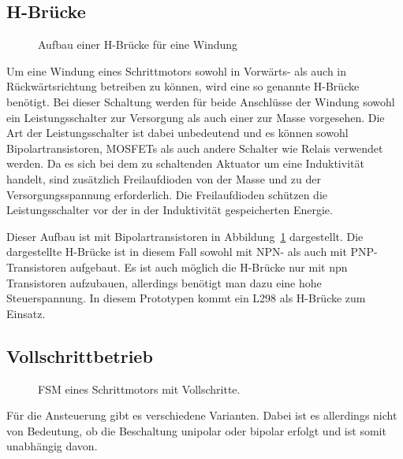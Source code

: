 \subsection{H-Brücke}

\begin{figure} \centering
	\begin{minipage}[t]{\linewidth} \centering
		
	\end{minipage}
	\caption{Aufbau einer H-Brücke für eine Windung}
	\label{img:hBruecke}
\end{figure}

Um eine Windung eines Schrittmotors sowohl in Vorwärts- als auch in Rückwärtsrichtung betreiben zu können, wird eine so genannte H-Brücke benötigt.
Bei dieser Schaltung werden für beide Anschlüsse der Windung sowohl ein Leistungsschalter zur Versorgung als auch einer zur Masse vorgesehen.
Die Art der Leistungsschalter ist dabei unbedeutend und es können sowohl Bipolartransistoren, MOSFETs als auch andere Schalter wie Relais verwendet werden.
Da es sich bei dem zu schaltenden Aktuator um eine Induktivität handelt, sind zusätzlich Freilaufdioden von der Masse und zu der Versorgungsspannung erforderlich.
Die Freilaufdioden schützen die Leistungsschalter vor der in der Induktivität gespeicherten Energie.

Dieser Aufbau ist mit Bipolartransistoren in Abbildung~\ref{img:hBruecke} dargestellt.
Die dargestellte H-Brücke ist in diesem Fall sowohl mit NPN- als auch mit PNP-Transistoren aufgebaut.
Es ist auch möglich die H-Brücke nur mit npn Transistoren aufzubauen, allerdings benötigt man dazu eine hohe Steuerspannung.
In diesem Prototypen kommt ein L298 als H-Brücke zum Einsatz.


\subsection{Vollschrittbetrieb}

\begin{figure}[!h] \centering
	\begin{minipage}[t]{.5\linewidth} \centering
		
	\end{minipage}
	\caption{FSM eines Schrittmotors mit Vollschritte.}
	\label{fig:fsmStepperVollschritt}
\end{figure}

Für die Ansteuerung gibt es verschiedene Varianten.
Dabei ist es allerdings nicht von Bedeutung, ob die Beschaltung unipolar oder bipolar erfolgt und ist somit unabhängig davon.

